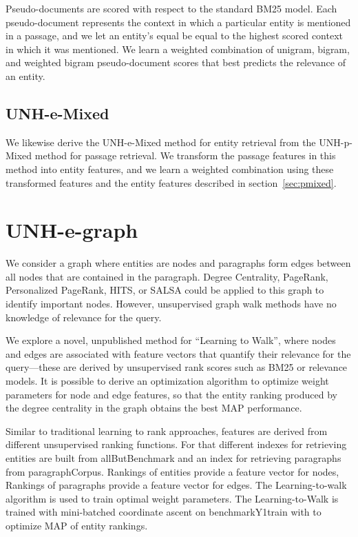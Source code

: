 \documentclass{article}
\begin{document}
Pseudo-documents are scored with respect to the standard BM25 model. 
Each pseudo-document represents the context in which a particular entity is mentioned in a passage, and we let an entity's equal be equal to the highest scored context in which it was mentioned. 
We learn a weighted combination of unigram, bigram, and weighted bigram pseudo-document scores that best predicts the relevance of an entity.




\subsection{UNH-e-Mixed}

We likewise derive the UNH-e-Mixed method for entity retrieval from the UNH-p-Mixed method for passage retrieval.
We transform the passage features in this method into entity features, and we learn a weighted combination using these transformed features and the entity features described in section~\ref{sec:pmixed}.



\section{UNH-e-graph}

We consider a graph where entities are nodes and paragraphs form edges between all nodes that are contained in the paragraph. Degree Centrality, PageRank, Personalized PageRank, HITS, or SALSA could be applied to this graph to identify important nodes. However, unsupervised graph walk methods have no knowledge of relevance for the query. 

We explore a novel, unpublished method for ``Learning to Walk'', where nodes and edges are associated with feature vectors that quantify their relevance for the query---these are derived by unsupervised rank scores such as BM25 or relevance models. It is possible to derive an optimization algorithm to optimize weight parameters for node and edge features, so that the entity ranking produced by the degree centrality in the graph obtains the best MAP performance.

Similar to traditional learning to rank approaches, features are derived from different unsupervised ranking functions. 
For that different indexes for retrieving entities  are built from allButBenchmark and an index for retrieving paragraphs from  paragraphCorpus. Rankings of entities provide a feature vector for nodes, Rankings of paragraphs provide a feature vector for edges.  The Learning-to-walk algorithm is used to train optimal weight parameters. The Learning-to-Walk is trained with mini-batched coordinate ascent on benchmarkY1train with to optimize MAP of entity rankings.
\end{document}
